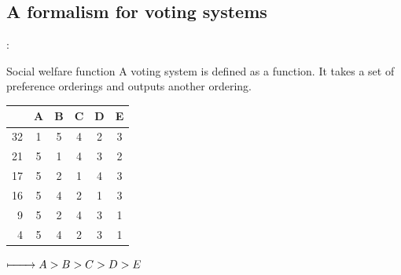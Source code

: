 \documentclass[utf8]{earlywinter}
\begin{document}
\subsection{A formalism for voting systems}
\begin{frame}{\secname: \subsecname}


%
%
%
  \begin{block}{Social welfare function}
    A voting system is defined as a function. It takes a set of preference orderings and outputs another ordering.
  \end{block}
 

  \begin{minipage}[l]{0.48\linewidth}
    \centering
  \begin{tabular}{r | c c c c c}
       & A & B & C & D & E \\ \hline
    32 & 1 & 5 & 4 & 2 & 3 \\
    21 & 5 & 1 & 4 & 3 & 2 \\
    17 & 5 & 2 & 1 & 4 & 3 \\
    16 & 5 & 4 & 2 & 1 & 3 \\
    9  & 5 & 2 & 4 & 3 & 1 \\
    4  & 5 & 4 & 2 & 3 & 1 \\ 
  \end{tabular}
  \end{minipage}
  \begin{minipage}[r]{0.5\linewidth}
    \centering
    $\xmapsto\qquad A > B > C > D > E$
  \end{minipage}

\end{frame}
\end{document}

